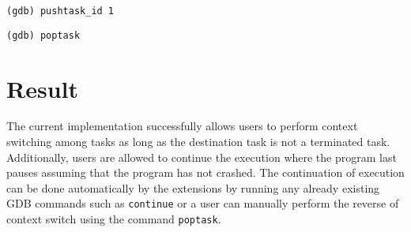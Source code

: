 \begin{lstlisting}[caption={\text{pushtask\_id} command}, label={pushtask-id}]
(gdb) pushtask_id 1
\end{lstlisting}

\begin{lstlisting}[caption={\text{poptask} command}, label={poptask}]
(gdb) poptask
\end{lstlisting}

\section{Result}
The current implementation successfully allows users to perform context
switching among tasks as long as the destination task is not a terminated
task. Additionally, users are allowed to continue the execution where the
program last pauses assuming that the program has not crashed. The continuation
of execution can be done automatically by the extensions by running any already
existing GDB commands such as \verb|continue| or a user can manually
perform the reverse of context switch using the command \verb|poptask|.

